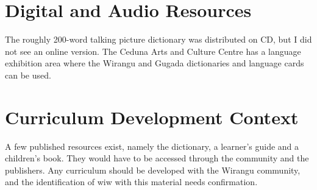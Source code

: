\documentclass[12pt]{article}
\begin{document}
\section{Digital and Audio Resources}
The roughly 200-word talking picture dictionary was distributed on CD, but I did not see an online version. The Ceduna Arts and Culture Centre has a language exhibition area where the Wirangu and Gugada dictionaries and language cards can be used.

\section{Curriculum Development Context}
A few published resources exist, namely the dictionary, a learner's guide and a children's book. They would have to be accessed through the community and the publishers. Any curriculum should be developed with the Wirangu community, and the identification of wiw with this material needs confirmation.
\end{document}
